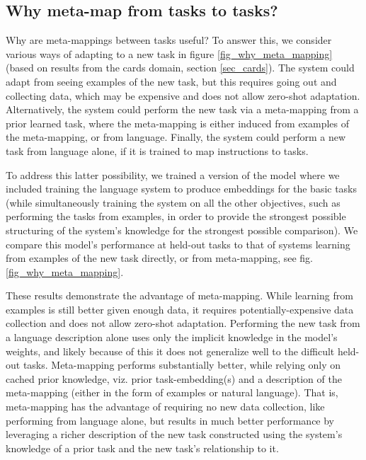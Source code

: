 \subsection{Why meta-map from tasks to tasks?} \label{app_why_meta_mapping}
Why are meta-mappings between tasks useful? To answer this, we consider various ways of adapting to a new task in figure \ref{fig_why_meta_mapping} (based on results from the cards domain, section \ref{sec_cards}). The system could adapt from seeing examples of the new task, but this requires going out and collecting data, which may be expensive and does not allow zero-shot adaptation. Alternatively, the system could perform the new task via a meta-mapping from a prior learned task, where the meta-mapping is either induced from examples of the meta-mapping, or from language. Finally, the system could perform a new task from language alone, if it is trained to map instructions to tasks. \par
To address this latter possibility, we trained a version of the model where we included training the language system to produce embeddings for the basic tasks (while simultaneously training the system on all the other objectives, such as performing the tasks from examples, in order to provide the strongest possible structuring of the system's knowledge for the strongest possible comparison). We compare this model's performance at held-out tasks to that of systems learning from examples of the new task directly, or from meta-mapping, see fig. \ref{fig_why_meta_mapping}. \par 
These results demonstrate the advantage of meta-mapping. While learning from examples is still better given enough data, it requires potentially-expensive data collection and does not allow zero-shot adaptation. Performing the new task from a language description alone uses only the implicit knowledge in the model's weights, and likely because of this it does not generalize well to the difficult held-out tasks. Meta-mapping performs substantially better, while relying only on cached prior knowledge, viz. prior task-embedding(s) and a description of the meta-mapping (either in the form of examples or natural language). That is, meta-mapping has the advantage of requiring no new data collection, like performing from language alone, but results in much better performance by leveraging a richer description of the new task constructed using the system's knowledge of a prior task and the new task's relationship to it.\par 
